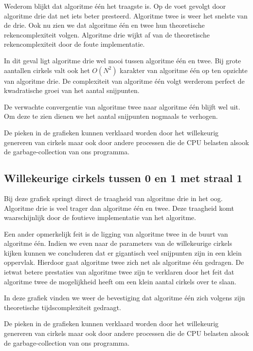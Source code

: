 \documentclass[11pt,a4paper]{article}
\begin{document}
Wederom blijkt dat algoritme \'e\'en het traagste is. Op de voet gevolgt door algoritme drie dat net iets beter presteerd. Algoritme twee is weer het snelste van de drie. Ook nu zien we dat algoritme \'e\'en en twee hun theoretische rekencomplexiteit volgen. Algoritme drie wijkt af van de theoretische rekencomplexiteit door de foute implementatie.

In dit geval ligt algoritme drie wel mooi tussen algoritme \'e\'en en twee. Bij grote aantallen cirkels valt ook het $O(N^{2})$ karakter van algoritme \'e\'en op ten opzichte van algoritme drie. De complexiteit van algoritme \'e\'en volgt werderom perfect de kwadratische groei van het aantal snijpunten.

De verwachte convergentie van algoritme twee naar algoritme \'e\'en blijft wel uit. Om deze te zien dienen we het aantal snijpunten nogmaals te verhogen.

De pieken in de grafieken kunnen verklaard worden door het willekeurig genereren van cirkels maar ook door andere processen die de CPU belasten alsook de garbage-collection van ons programma. 

\subsection{Willekeurige cirkels tussen 0 en 1 met straal 1}

Bij deze grafiek springt direct de traagheid van algoritme drie in het oog. Algoritme drie is veel trager dan algoritme \'e\'en en twee. Deze traagheid komt waarschijnlijk door de foutieve implementatie van het algoritme.

Een ander opmerkelijk feit is de ligging van algoritme twee in de buurt van algoritme \'e\'en. Indien we even naar de parameters van de willekeurige cirkels kijken kunnen we concluderen dat er gigantisch veel snijpunten zijn in een klein oppervlak. Hierdoor gaat algoritme twee zich net als algoritme \'e\'en gedragen. De ietwat betere prestaties van algoritme twee zijn te verklaren door het feit dat algoritme twee de mogelijkheid heeft om een klein aantal cirkels over te slaan.

In deze grafiek vinden we weer de bevestiging dat algoritme \'e\'en zich volgens zijn theoretische tijdscomplexiteit gedraagt.

De pieken in de grafieken kunnen verklaard worden door het willekeurig genereren van cirkels maar ook door andere processen die de CPU belasten alsook de garbage-collection van ons programma. 
\end{document}
